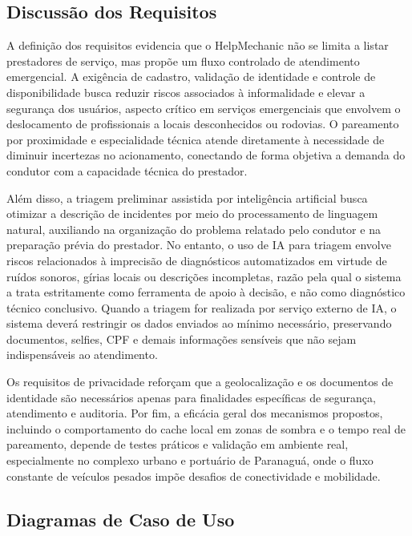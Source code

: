 \documentclass[12pt, a4paper]{article}
\begin{document}
\subsection{Discussão dos Requisitos}
A definição dos requisitos evidencia que o HelpMechanic não se limita a listar prestadores de serviço, mas propõe um fluxo controlado de atendimento emergencial. A exigência de cadastro, validação de identidade e controle de disponibilidade busca reduzir riscos associados à informalidade e elevar a segurança dos usuários, aspecto crítico em serviços emergenciais que envolvem o deslocamento de profissionais a locais desconhecidos ou rodovias. O pareamento por proximidade e especialidade técnica atende diretamente à necessidade de diminuir incertezas no acionamento, conectando de forma objetiva a demanda do condutor com a capacidade técnica do prestador.

Além disso, a triagem preliminar assistida por inteligência artificial busca otimizar a descrição de incidentes por meio do processamento de linguagem natural, auxiliando na organização do problema relatado pelo condutor e na preparação prévia do prestador. No entanto, o uso de IA para triagem envolve riscos relacionados à imprecisão de diagnósticos automatizados em virtude de ruídos sonoros, gírias locais ou descrições incompletas, razão pela qual o sistema a trata estritamente como ferramenta de apoio à decisão, e não como diagnóstico técnico conclusivo. Quando a triagem for realizada por serviço externo de IA, o sistema deverá restringir os dados enviados ao mínimo necessário, preservando documentos, selfies, CPF e demais informações sensíveis que não sejam indispensáveis ao atendimento.

Os requisitos de privacidade reforçam que a geolocalização e os documentos de identidade são necessários apenas para finalidades específicas de segurança, atendimento e auditoria. Por fim, a eficácia geral dos mecanismos propostos, incluindo o comportamento do cache local em zonas de sombra e o tempo real de pareamento, depende de testes práticos e validação em ambiente real, especialmente no complexo urbano e portuário de Paranaguá, onde o fluxo constante de veículos pesados impõe desafios de conectividade e mobilidade.

\subsection{Diagramas de Caso de Uso}
\end{document}
